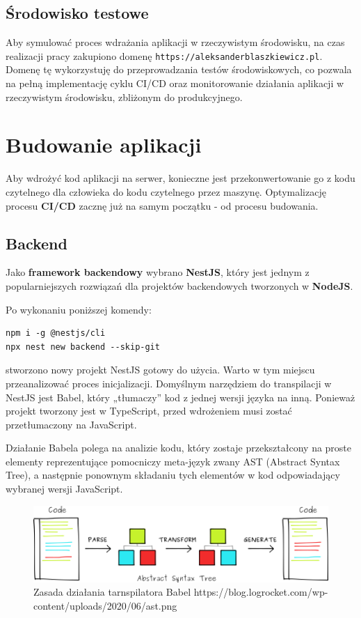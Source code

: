 \documentclass{article}
\begin{document}
\subsection{Środowisko testowe}

Aby symulować proces wdrażania aplikacji w rzeczywistym środowisku, na czas realizacji pracy zakupiono domenę \lstinline|https://aleksanderblaszkiewicz.pl|. Domenę tę wykorzystuję do przeprowadzania testów środowiskowych, co pozwala na pełną implementację cyklu CI/CD oraz monitorowanie działania aplikacji w rzeczywistym środowisku, zbliżonym do produkcyjnego.

\section{Budowanie aplikacji} \label{sectionBudowanieAplikacji}

Aby wdrożyć kod aplikacji na serwer, konieczne jest przekonwertowanie go z kodu czytelnego dla człowieka do kodu czytelnego przez maszynę. Optymalizację procesu \textbf{CI/CD} zacznę już na samym początku - od procesu budowania.

\subsection{Backend}

Jako \textbf{framework backendowy} wybrano \textbf{NestJS}, który jest jednym z popularniejszych rozwiązań dla projektów backendowych tworzonych w \textbf{NodeJS}.

Po wykonaniu poniższej komendy:
\begin{lstlisting}[caption=Komenda uruchamiająca scaffolding projektu NestJS]
npm i -g @nestjs/cli
npx nest new backend --skip-git
\end{lstlisting}

stworzono nowy projekt NestJS gotowy do użycia. Warto w tym miejscu przeanalizować proces inicjalizacji. Domyślnym narzędziem do transpilacji w NestJS jest Babel, który „tłumaczy” kod z jednej wersji języka na inną. Ponieważ projekt tworzony jest w TypeScript, przed wdrożeniem musi zostać przetłumaczony na JavaScript.

Działanie Babela\cite{BabelWikipedia} polega na analizie kodu, który zostaje przekształcony na proste elementy reprezentujące pomocniczy meta-język zwany AST (Abstract Syntax Tree), a następnie ponownym składaniu tych elementów w kod odpowiadający wybranej wersji JavaScript.


\begin{figure}[H]
    \centering
    \includegraphics[width=\textwidth]{ast.png}
    \caption{Zasada działania tarnspilatora Babel https://blog.logrocket.com/wp-content/uploads/2020/06/ast.png}
    \label{fig:ast}
\end{figure}
\end{document}
